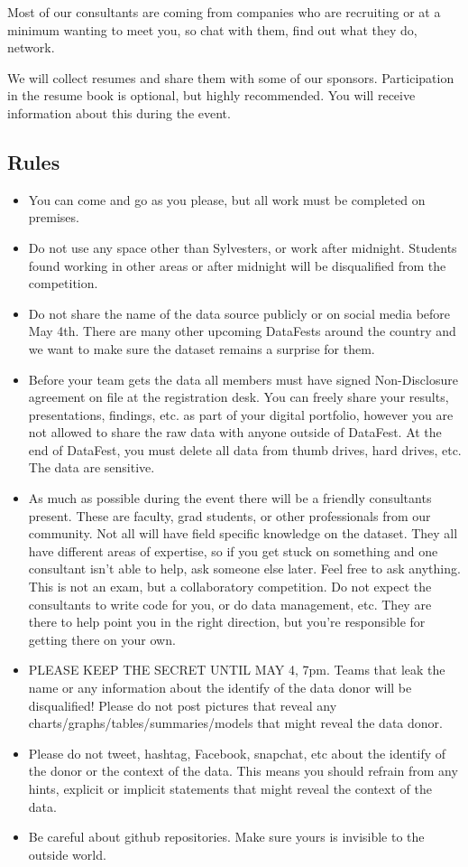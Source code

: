 \documentclass[]{article}
\begin{document}
Most of our consultants are coming from companies who are recruiting or
at a minimum wanting to meet you, so chat with them, find out what they
do, network.

We will collect resumes and share them with some of our sponsors.
Participation in the resume book is optional, but highly recommended.
You will receive information about this during the event.

\hypertarget{rules}{%
\subsection{Rules}\label{rules}}

\begin{itemize}
\item
  You can come and go as you please, but all work must be completed on
  premises.
\item
  Do not use any space other than Sylvesters, or work after midnight.
  Students found working in other areas or after midnight will be
  disqualified from the competition.
\item
  Do not share the name of the data source publicly or on social media
  before May 4th. There are many other upcoming DataFests around the
  country and we want to make sure the dataset remains a surprise for
  them.
\item
  Before your team gets the data all members must have signed
  Non-Disclosure agreement on file at the registration desk. You can
  freely share your results, presentations, findings, etc. as part of
  your digital portfolio, however you are not allowed to share the raw
  data with anyone outside of DataFest. At the end of DataFest, you must
  delete all data from thumb drives, hard drives, etc. The data are
  sensitive.
\item
  As much as possible during the event there will be a friendly
  consultants present. These are faculty, grad students, or other
  professionals from our community. Not all will have field specific
  knowledge on the dataset. They all have different areas of expertise,
  so if you get stuck on something and one consultant isn't able to
  help, ask someone else later. Feel free to ask anything. This is not
  an exam, but a collaboratory competition. Do not expect the
  consultants to write code for you, or do data management, etc. They
  are there to help point you in the right direction, but you're
  responsible for getting there on your own.
\item
  PLEASE KEEP THE SECRET UNTIL MAY 4, 7pm. Teams that leak the name or
  any information about the identify of the data donor will be
  disqualified! Please do not post pictures that reveal any
  charts/graphs/tables/summaries/models that might reveal the data
  donor.
\item
  Please do not tweet, hashtag, Facebook, snapchat, etc about the
  identify of the donor or the context of the data. This means you
  should refrain from any hints, explicit or implicit statements that
  might reveal the context of the data.
\item
  Be careful about github repositories. Make sure yours is invisible to
  the outside world.
\end{itemize}
\end{document}
